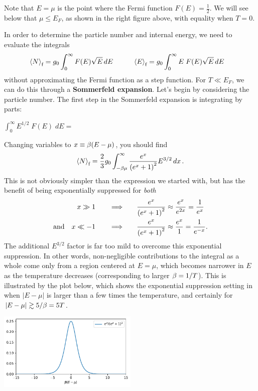Note that $E = \mu$ is the point where the Fermi function $F(E) = \frac{1}{2}$.
We will see below that $\mu \leq E_F$, as shown in the right figure above, with equality when $T = 0$.

In order to determine the particle number and internal energy, we need to evaluate the integrals
\begin{align}
  \label{eq:DoS_full}
  \left\langle N \right\rangle_{\text{f}} & = g_0 \int_0^{\infty} F(E) \sqrt{E} \mathop{dE} \qquad &
  \left\langle E \right\rangle_{\text{f}} & = g_0 \int_0^{\infty} E \; F(E) \sqrt{E} \mathop{dE}
\end{align}
without approximating the Fermi function as a step function.
For $T \ll E_F$, we can do this through a \textbf{Sommerfeld expansion}.
Let's begin by considering the particle number.
The first step in the Sommerfeld expansion is integrating by parts:
\begin{mdframed}
  $\displaystyle \int_0^{\infty} E^{1 / 2} \; F(E) \; dE = $ \\[120 pt]
\end{mdframed}

Changing variables to $x \equiv \beta(E - \mu)$, you should find
\begin{equation*}
  \left\langle N \right\rangle_{\text{f}} = \frac{2}{3} g_0 \int_{-\beta\mu}^{\infty} \frac{e^x}{\left(e^x + 1\right)^2} E^{3 / 2} \mathop{dx}.
\end{equation*}
This is not obviously simpler than the expression we started with, but has the benefit of being exponentially suppressed for \textit{both}
\begin{align*}
                   x \gg 1  \qquad \Longrightarrow \qquad & \frac{e^x}{\left(e^x + 1\right)^2} \approx \frac{e^x}{e^{2x}} = \frac{1}{e^x} \\
  \mbox{and} \quad x \ll -1 \qquad \Longrightarrow \qquad & \frac{e^x}{\left(e^x + 1\right)^2} \approx \frac{e^x}{1} = \frac{1}{e^{-x}}.
\end{align*}
The additional $E^{3 / 2}$ factor is far too mild to overcome this exponential suppression.
In other words, non-negligible contributions to the integral as a whole come only from a region centered at $E = \mu$, which becomes narrower in $E$ as the temperature decreases (corresponding to larger $\beta = 1 / T$).
This is illustrated by the plot below, which shows the exponential suppression setting in when $|E - \mu|$ is larger than a few times the temperature, and certainly for $|E - \mu| \gtrsim 5 / \beta = 5T$. \\[-24 pt]
\begin{center}\noindent\includegraphics[width=0.5\textwidth]{figs/unit08_Sommerfeld.pdf}\end{center} %


